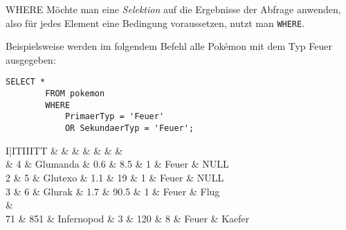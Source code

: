 \begin{sql}{WHERE}
    Möchte man eine \emph{Selektion} auf die Ergebnisse der Abfrage anwenden, also für jedes Element eine Bedingung voraussetzen, nutzt man \texttt{WHERE}.

    Beispielsweise werden im folgendem Befehl alle Pokémon mit dem Typ Feuer ausgegeben:

    \begin{lstlisting}[language=mysql]
        SELECT *
        FROM pokemon
        WHERE
            PrimaerTyp = 'Feuer'
            OR SekundaerTyp = 'Feuer';
    \end{lstlisting}

    \setcounter{rownum}{0}
    \begin{tabular}{I|ITIIITT}
                                   &     &  &  &  &  &  &  \\                          & 4                         & Glumanda                 & 0.6                         & 8.5                         & 1                              & Feuer                          & NULL                             \\
        2                          & 5                         & Glutexo                  & 1.1                         & 19                          & 1                              & Feuer                          & NULL                             \\
        3                          & 6                         & Glurak                   & 1.7                         & 90.5                        & 1                              & Feuer                          & Flug                             \\
         &                                                                                                                                                                                              \\
        71                         & 851                       & Infernopod               & 3                           & 120                         & 8                              & Feuer                          & Kaefer                           \\
    \end{tabular}
\end{sql}

